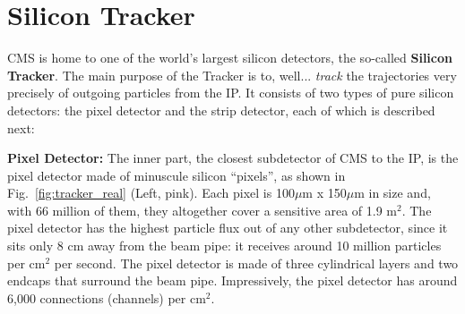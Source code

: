 \section{Silicon Tracker}
CMS is home to one of the world's largest silicon detectors, the so-called {\bf Silicon Tracker}.
The main purpose of the Tracker is to, well... \emph{track} the trajectories very precisely of outgoing particles from the IP.
It consists of two types of pure silicon detectors: the pixel detector and the strip detector, each of which is described next: 

{\bf Pixel Detector:} The inner part, the closest subdetector of CMS to the IP, is the pixel detector made of minuscule silicon ``pixels'', as shown in Fig.~\ref{fig:tracker_real} (Left, pink).
Each pixel is 100$\mu$m x 150$\mu$m in size and, with 66 million of them, they altogether cover a sensitive area of 1.9 m$^2$. 
The pixel detector has the highest particle flux out of any other subdetector, since it sits only 8 cm away from the beam pipe:
it receives around 10 million particles per cm$^2$ per second.
The pixel detector is made of three cylindrical layers and two endcaps that surround the beam pipe.
Impressively, the pixel detector has around 6,000 connections (channels) per cm$^2$.

